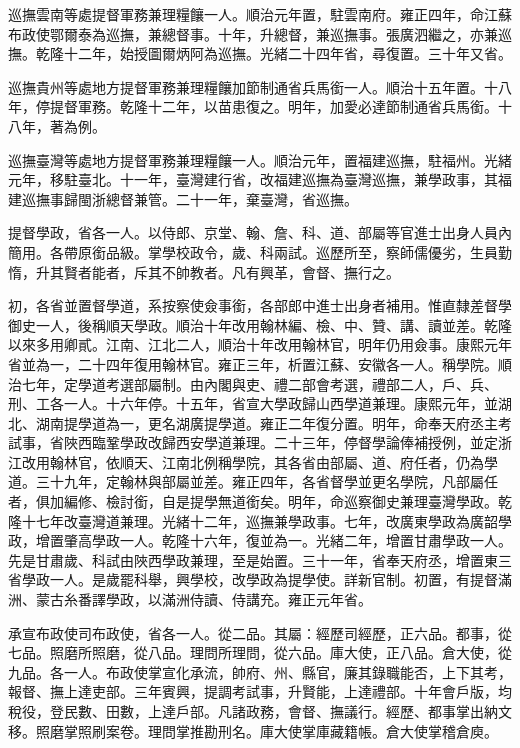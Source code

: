 \begin{pinyinscope}
巡撫雲南等處提督軍務兼理糧饟一人。順治元年置，駐雲南府。雍正四年，命江蘇布政使鄂爾泰為巡撫，兼總督事。十年，升總督，兼巡撫事。張廣泗繼之，亦兼巡撫。乾隆十二年，始授圖爾炳阿為巡撫。光緒二十四年省，尋復置。三十年又省。

巡撫貴州等處地方提督軍務兼理糧饟加節制通省兵馬銜一人。順治十五年置。十八年，停提督軍務。乾隆十二年，以苗患復之。明年，加愛必達節制通省兵馬銜。十八年，著為例。

巡撫臺灣等處地方提督軍務兼理糧饟一人。順治元年，置福建巡撫，駐福州。光緒元年，移駐臺北。十一年，臺灣建行省，改福建巡撫為臺灣巡撫，兼學政事，其福建巡撫事歸閩浙總督兼管。二十一年，棄臺灣，省巡撫。

提督學政，省各一人。以侍郎、京堂、翰、詹、科、道、部屬等官進士出身人員內簡用。各帶原銜品級。掌學校政令，歲、科兩試。巡歷所至，察師儒優劣，生員勤惰，升其賢者能者，斥其不帥教者。凡有興革，會督、撫行之。

初，各省並置督學道，系按察使僉事銜，各部郎中進士出身者補用。惟直隸差督學御史一人，後稱順天學政。順治十年改用翰林編、檢、中、贊、講、讀並差。乾隆以來多用卿貳。江南、江北二人，順治十年改用翰林官，明年仍用僉事。康熙元年省並為一，二十四年復用翰林官。雍正三年，析置江蘇、安徽各一人。稱學院。順治七年，定學道考選部屬制。由內閣與吏、禮二部會考選，禮部二人，戶、兵、刑、工各一人。十六年停。十五年，省宣大學政歸山西學道兼理。康熙元年，並湖北、湖南提學道為一，更名湖廣提學道。雍正二年復分置。明年，命奉天府丞主考試事，省陜西臨鞏學政改歸西安學道兼理。二十三年，停督學論俸補授例，並定浙江改用翰林官，依順天、江南北例稱學院，其各省由部屬、道、府任者，仍為學道。三十九年，定翰林與部屬並差。雍正四年，各省督學並更名學院，凡部屬任者，俱加編修、檢討銜，自是提學無道銜矣。明年，命巡察御史兼理臺灣學政。乾隆十七年改臺灣道兼理。光緒十二年，巡撫兼學政事。七年，改廣東學政為廣韶學政，增置肇高學政一人。乾隆十六年，復並為一。光緒二年，增置甘肅學政一人。先是甘肅歲、科試由陜西學政兼理，至是始置。三十一年，省奉天府丞，增置東三省學政一人。是歲罷科舉，興學校，改學政為提學使。詳新官制。初置，有提督滿洲、蒙古糸番譯學政，以滿洲侍讀、侍講充。雍正元年省。

承宣布政使司布政使，省各一人。從二品。其屬：經歷司經歷，正六品。都事，從七品。照磨所照磨，從八品。理問所理問，從六品。庫大使，正八品。倉大使，從九品。各一人。布政使掌宣化承流，帥府、州、縣官，廉其錄職能否，上下其考，報督、撫上達吏部。三年賓興，提調考試事，升賢能，上達禮部。十年會戶版，均稅役，登民數、田數，上達戶部。凡諸政務，會督、撫議行。經歷、都事掌出納文移。照磨掌照刷案卷。理問掌推勘刑名。庫大使掌庫藏籍帳。倉大使掌稽倉庾。


\end{pinyinscope}
